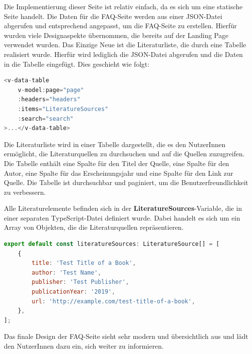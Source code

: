 
Die Implementierung dieser Seite ist relativ einfach, da es sich um eine statische Seite handelt. Die Daten für die FAQ-Seite werden aus einer \acs{JSON}-Datei abgerufen und entsprechend angepasst, um die FAQ-Seite zu erstellen. Hierfür wurden viele Designaspekte übernommen, die bereits auf der Landing Page verwendet wurden. Das Einzige Neue ist die Literaturliste, die durch eine Tabelle realisiert wurde. Hierfür wird lediglich die \acs{JSON}-Datei abgerufen und die Daten in die Tabelle eingefügt. Dies geschieht wie folgt:

\begin{lstlisting}[language={JavaScript}, caption={Laden der Literaturliste}]
<v-data-table
    v-model:page="page"
    :headers="headers"
    :items="LiteratureSources"
    :search="search"
>...</v-data-table>
\end{lstlisting}

Die Literaturliste wird in einer Tabelle dargestellt, die es den NutzerInnen ermöglicht, die Literaturquellen zu durchsuchen und auf die Quellen zuzugreifen. Die Tabelle enthält eine Spalte für den Titel der Quelle, eine Spalte für den Autor, eine Spalte für das Erscheinungsjahr und eine Spalte für den Link zur Quelle. Die Tabelle ist durchsuchbar und paginiert, um die Benutzerfreundlichkeit zu verbessern.

Alle Literaturelemente befinden sich in der \textbf{LiteratureSources}-Variable, die in einer separaten TypeScript-Datei definiert wurde. Dabei handelt es sich um ein Array von Objekten, die die Literaturquellen repräsentieren.

\begin{lstlisting}[language={JavaScript}, caption={Literaturelemente}]
export default const literatureSources: LiteratureSource[] = [
    {
        title: 'Test Title of a Book',
        author: 'Test Name',
        publisher: 'Test Publisher',
        publicationYear: '2019',
        url: 'http://example.com/test-title-of-a-book',
    },
];
\end{lstlisting}

Das finale Design der FAQ-Seite sieht sehr modern und übersichtlich aus und lädt den NutzerInnen dazu ein, sich weiter zu informieren.

